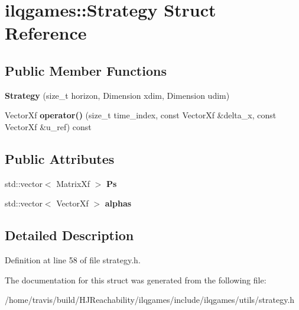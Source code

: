 \hypertarget{structilqgames_1_1_strategy}{}\section{ilqgames\+:\+:Strategy Struct Reference}
\label{structilqgames_1_1_strategy}
\subsection*{Public Member Functions}
\begin{DoxyCompactItemize}
\item 
{\bfseries Strategy} (size\+\_\+t horizon, Dimension xdim, Dimension udim)\hypertarget{structilqgames_1_1_strategy_a60de8ff226997a36f83ffd157c868456}{}\label{structilqgames_1_1_strategy_a60de8ff226997a36f83ffd157c868456}

\item 
Vector\+Xf {\bfseries operator()} (size\+\_\+t time\+\_\+index, const Vector\+Xf \&delta\+\_\+x, const Vector\+Xf \&u\+\_\+ref) const \hypertarget{structilqgames_1_1_strategy_ab2c02755490cfb3d88a062d6b0412306}{}\label{structilqgames_1_1_strategy_ab2c02755490cfb3d88a062d6b0412306}

\end{DoxyCompactItemize}
\subsection*{Public Attributes}
\begin{DoxyCompactItemize}
\item 
std\+::vector$<$ Matrix\+Xf $>$ {\bfseries Ps}\hypertarget{structilqgames_1_1_strategy_a388b037f047ca7ae2070dec436100331}{}\label{structilqgames_1_1_strategy_a388b037f047ca7ae2070dec436100331}

\item 
std\+::vector$<$ Vector\+Xf $>$ {\bfseries alphas}\hypertarget{structilqgames_1_1_strategy_a23297cf741c8faf93010f24dca1ce582}{}\label{structilqgames_1_1_strategy_a23297cf741c8faf93010f24dca1ce582}

\end{DoxyCompactItemize}


\subsection{Detailed Description}


Definition at line 58 of file strategy.\+h.



The documentation for this struct was generated from the following file\+:\begin{DoxyCompactItemize}
\item 
/home/travis/build/\+H\+J\+Reachability/ilqgames/include/ilqgames/utils/strategy.\+h\end{DoxyCompactItemize}

